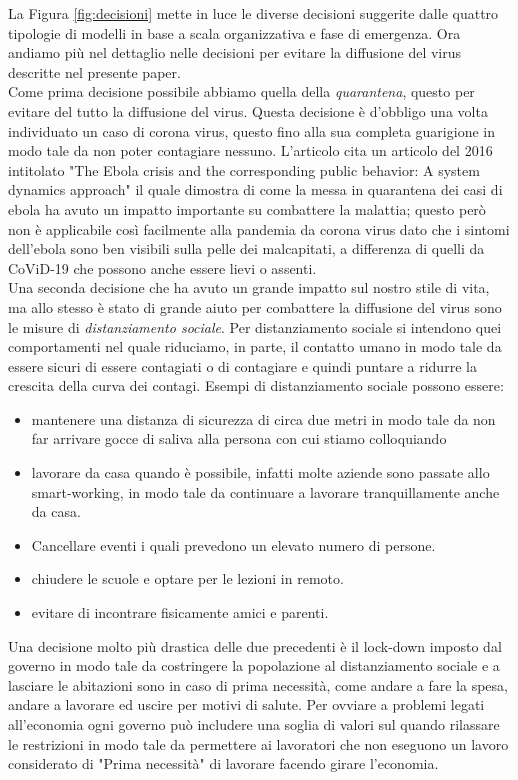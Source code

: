 \documentclass[12pt, openany]{book}
\begin{document}
 	La Figura \ref{fig:decisioni} mette in luce le diverse decisioni suggerite dalle quattro tipologie di modelli in base a scala organizzativa e fase di emergenza.
	Ora andiamo più nel dettaglio nelle decisioni per evitare la diffusione del virus descritte nel presente paper.\\
	Come prima decisione possibile abbiamo quella della \emph{quarantena}, questo per evitare del tutto la diffusione del virus. Questa decisione è d'obbligo una volta individuato un caso di corona virus, questo fino alla sua completa guarigione in modo tale da non poter contagiare nessuno. L'articolo cita un articolo del 2016 intitolato "The Ebola crisis and the corresponding public behavior: A system dynamics approach" il quale dimostra di come la messa in quarantena dei casi di ebola ha avuto un impatto importante su combattere la malattia; questo però non è applicabile così facilmente alla pandemia da corona virus dato che i sintomi dell'ebola sono ben visibili sulla pelle dei malcapitati, a differenza di quelli da CoViD-19 che possono anche essere lievi o assenti.\\
	Una seconda decisione che ha avuto un grande impatto sul nostro stile di vita, ma allo stesso è stato di grande aiuto per combattere la diffusione del virus sono le misure di \emph{distanziamento sociale}. Per distanziamento sociale si intendono quei comportamenti nel quale riduciamo, in parte, il contatto umano in modo tale da essere sicuri di essere contagiati o di contagiare e quindi puntare a ridurre la crescita della curva dei contagi. Esempi di distanziamento sociale possono essere: \begin{itemize}
		\item mantenere una distanza di sicurezza di circa due metri in modo tale da non far arrivare gocce di saliva alla persona con cui stiamo colloquiando
		\item lavorare da casa quando è possibile, infatti molte aziende sono passate allo smart-working, in modo tale da continuare a lavorare tranquillamente anche da casa.
		\item Cancellare eventi i quali prevedono un elevato numero di persone.
		\item chiudere le scuole e optare per le lezioni in remoto.
		\item evitare di incontrare fisicamente amici e parenti.
	\end{itemize}
	Una decisione molto più drastica delle due precedenti è il lock-down imposto dal governo in modo tale da costringere la popolazione al distanziamento sociale e a lasciare le abitazioni sono in caso di prima necessità, come andare a fare la spesa, andare a lavorare ed uscire per motivi di salute. Per ovviare a problemi legati all'economia ogni governo può includere una soglia di valori sul quando rilassare le restrizioni in modo tale da permettere ai lavoratori che non eseguono un lavoro considerato di "Prima necessità" di lavorare facendo girare l'economia.\\
\end{document}

